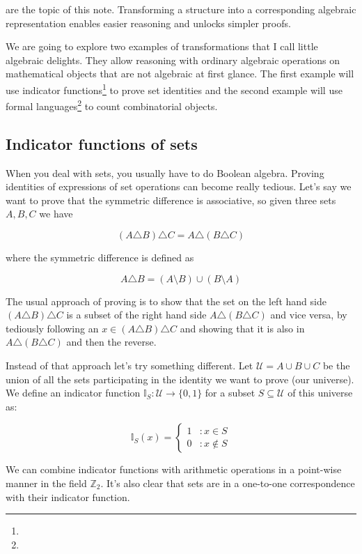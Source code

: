  are the topic of this note. Transforming a structure into a corresponding algebraic representation enables easier reasoning and unlocks simpler proofs.

We are going to explore two examples of transformations that I call little algebraic delights. They allow reasoning with ordinary algebraic operations on mathematical objects that are not algebraic at first glance. The first example will use indicator functions\footnote{} to prove set identities and the second example will use formal languages\footnote{} to count combinatorial objects.

\subsection{Indicator functions of sets}

When you deal with sets, you usually have to do Boolean algebra. Proving identities of expressions of set operations can become really tedious. Let's say we want to prove that the symmetric difference is associative, so given three sets $A, B, C$ we have

$$
(A \triangle B) \triangle C = A \triangle (B \triangle C)
$$

where the symmetric difference is defined as 

$$
A \triangle B = (A \setminus B) \cup (B \setminus A)
$$

The usual approach of proving is to show that the set on the left hand side $(A \triangle B) \triangle C$ is a subset of the right hand side $A \triangle (B \triangle C)$ and vice versa, by tediously following an $x \in (A \triangle B) \triangle C$ and showing that it is also in $A \triangle (B \triangle C)$ and then the reverse.

Instead of that approach let's try something different. Let ${\mathcal{U} = A \cup B \cup C}$ be the union of all the sets participating in the identity we want to prove (our universe). We define an indicator function ${\mathbb{I}_S: \mathcal{U} \to \{0, 1\}}$ for a subset $S \subseteq \mathcal{U}$ of this universe as:

$$
\mathbb{I}_S(x) =  \begin{cases}
   1 & : x \in S\\
   0 & : x \notin S
\end{cases}
$$ 

We can combine indicator functions with arithmetic operations in a point-wise manner in the field $\mathbb{Z}_2$. It's also clear that sets are in a one-to-one correspondence with their indicator function.

